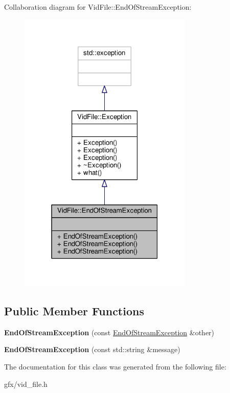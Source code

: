 Collaboration diagram for Vid\+File\+:\+:End\+Of\+Stream\+Exception\+:
\nopagebreak
\begin{figure}[H]
\begin{center}
\leavevmode
\includegraphics[width=235pt]{d7/d84/classVidFile_1_1EndOfStreamException__coll__graph}
\end{center}
\end{figure}
\subsection*{Public Member Functions}
\begin{DoxyCompactItemize}
\item 
{\bfseries End\+Of\+Stream\+Exception} (const \hyperlink{classVidFile_1_1EndOfStreamException}{End\+Of\+Stream\+Exception} \&other)\hypertarget{classVidFile_1_1EndOfStreamException_ac981f4f5c68edecae91132d23371998c}{}\label{classVidFile_1_1EndOfStreamException_ac981f4f5c68edecae91132d23371998c}

\item 
{\bfseries End\+Of\+Stream\+Exception} (const std\+::string \&message)\hypertarget{classVidFile_1_1EndOfStreamException_a54528a69392168802b15272097bac8f9}{}\label{classVidFile_1_1EndOfStreamException_a54528a69392168802b15272097bac8f9}

\end{DoxyCompactItemize}


The documentation for this class was generated from the following file\+:\begin{DoxyCompactItemize}
\item 
gfx/vid\+\_\+file.\+h\end{DoxyCompactItemize}
